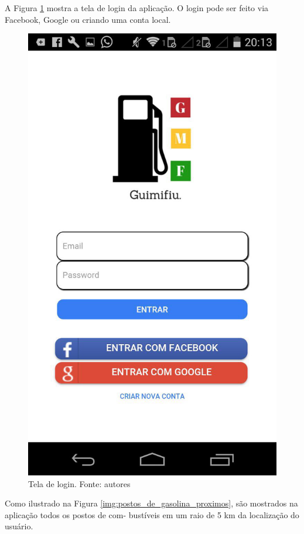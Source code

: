 A Figura \ref{img:tela_de_login} mostra a tela de login da aplicação. O login pode ser feito via Facebook, Google ou criando uma conta local.

\begin{figure}[H]
    \centering
    \includegraphics[scale=0.2]{figuras/app_1.jpg}
    \caption[Tela de login]{Tela de login. Fonte: autores}
    \label{img:tela_de_login}
\end{figure}

Como ilustrado na Figura \ref{img:postos_de_gasolina_proximos}, são mostrados na aplicação todos os postos de com- bustíveis em um raio de 5 km da localização do usuário.


